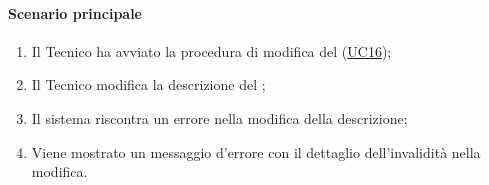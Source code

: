 \paragraph*{Scenario principale}
\begin{enumerate}
  \item Il Tecnico ha avviato la procedura di modifica del  (\hyperref[UC16]{UC16});
  \item Il Tecnico modifica la descrizione del ;
  \item Il sistema riscontra un errore nella modifica della descrizione;
  \item Viene mostrato un messaggio d'errore con il dettaglio dell'invalidità nella modifica.  
\end{enumerate}